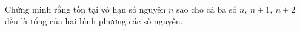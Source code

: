 \ifshowproblem
\begin{problem}\label{example:THA-2015-TSTST-E-P1}
    Chứng minh rằng tồn tại vô hạn số nguyên \( n \) sao cho cả ba số \( n,\ n + 1,\ n + 2 \) đều là tổng của hai bình phương các số nguyên.
\end{problem}
\fi

\footnotemark
{}
\fi